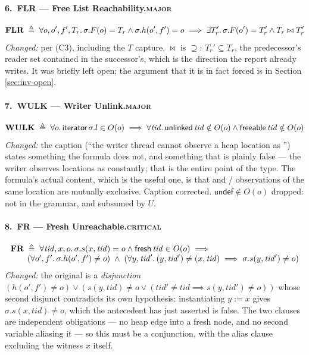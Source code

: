 \paragraph{6.\ FLR --- Free List Reachability.\hfill\textsc{major}}
\[
\textbf{FLR} \;\triangleq\; \forall o,o',f',T_{r} \ldotp
  \sigma.F(o) = T_{r} \land \sigma.h(o',f') = o
  \implies \exists T_{r}' \ldotp \sigma.F(o') = T_{r}' \land T_{r} \bowtie T_{r}'
\]
\emph{Changed:} per (C3), including the $T$ capture.  $\bowtie$ is $\supseteq$:
$T_{r}' \subseteq T_{r}$, the predecessor's reader set contained in the
successor's, which is the direction the report already writes.  It was briefly
left open; the argument that it is in fact forced is in
Section \ref{sec:inv-open}.

\paragraph{7.\ WULK --- Writer Unlink.\hfill\textsc{major}}
\[
\textbf{WULK} \;\triangleq\; \forall o \ldotp \textsf{iterator}\,\sigma.l \in O(o) \implies
  \forall \mathit{tid} \ldotp \textsf{unlinked}\,\mathit{tid} \notin O(o) \land \textsf{freeable}\,\mathit{tid} \notin O(o)
\]
\emph{Changed:} the caption (``the writer thread cannot observe a heap location
as \unlk'') states something the formula does not, and something that is plainly
false --- the writer observes locations as \unlk{} constantly; that is the
entire point of the type. The formula's actual content, which is the useful one,
is that \itr{} and \unlk/\frbl{} observations of the same location are mutually
exclusive.  Caption corrected. $\textsf{undef} \notin O(o)$ dropped: not in the
grammar, and subsumed by $U$.

\paragraph{8.\ FR --- Fresh Unreachable.\hfill\textsc{critical}}
\[
\begin{array}{l}
\textbf{FR} \;\triangleq\; \forall \mathit{tid},x,o \ldotp
  \sigma.s(x,\mathit{tid}) = o \land \textsf{fresh}\,\mathit{tid} \in O(o) \implies \\
\qquad (\forall o',f' \ldotp \sigma.h(o',f') \neq o)
\;\land\;
  (\forall y,\mathit{tid}' \ldotp (y,\mathit{tid}') \neq (x,\mathit{tid}) \implies \sigma.s(y,\mathit{tid}') \neq o)
\end{array}
\]
\emph{Changed:} the original is a \emph{disjunction}
$(h(o',f') \neq o) \lor (s(y,\mathit{tid}) \neq o \lor (\mathit{tid}' \neq
\mathit{tid} \implies s(y,\mathit{tid}') \neq o))$ whose second disjunct
contradicts its own hypothesis: instantiating $y := x$ gives
$\sigma.s(x,\mathit{tid}) \neq o$, which the antecedent has just asserted is
false.  The two clauses are independent obligations --- no heap edge into a
fresh node, and no second variable aliasing it --- so this must be a
conjunction, with the alias clause excluding the witness $x$ itself.

